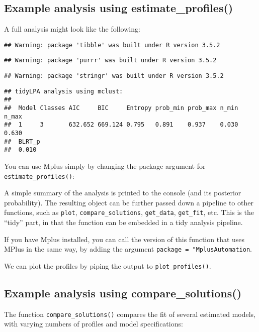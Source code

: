\documentclass[man]{apa6}
\begin{document}
\subsection{Example analysis using
estimate\_profiles()}\label{example-analysis-using-estimate_profiles}

A full analysis might look like the following:

\begin{verbatim}
## Warning: package 'tibble' was built under R version 3.5.2
\end{verbatim}

\begin{verbatim}
## Warning: package 'purrr' was built under R version 3.5.2
\end{verbatim}

\begin{verbatim}
## Warning: package 'stringr' was built under R version 3.5.2
\end{verbatim}

\begin{verbatim}
## tidyLPA analysis using mclust: 
## 
##  Model Classes AIC     BIC     Entropy prob_min prob_max n_min n_max
##  1     3       632.652 669.124 0.795   0.891    0.937    0.030 0.630
##  BLRT_p
##  0.010
\end{verbatim}

You can use Mplus simply by changing the package argument for
\texttt{estimate\_profiles()}:

A simple summary of the analysis is printed to the console (and its
posterior probability). The resulting object can be further passed down
a pipeline to other functions, such as \texttt{plot},
\texttt{compare\_solutions}, \texttt{get\_data}, \texttt{get\_fit}, etc.
This is the \enquote{tidy} part, in that the function can be embedded in
a tidy analysis pipeline.

If you have Mplus installed, you can call the version of this function
that uses MPlus in the same way, by adding the argument
\texttt{package\ =\ "MplusAutomation}.

We can plot the profiles by piping the output to
\texttt{plot\_profiles()}.

\subsection{Example analysis using
compare\_solutions()}\label{example-analysis-using-compare_solutions}

The function \texttt{compare\_solutions()} compares the fit of several
estimated models, with varying numbers of profiles and model
specifications:
\end{document}
